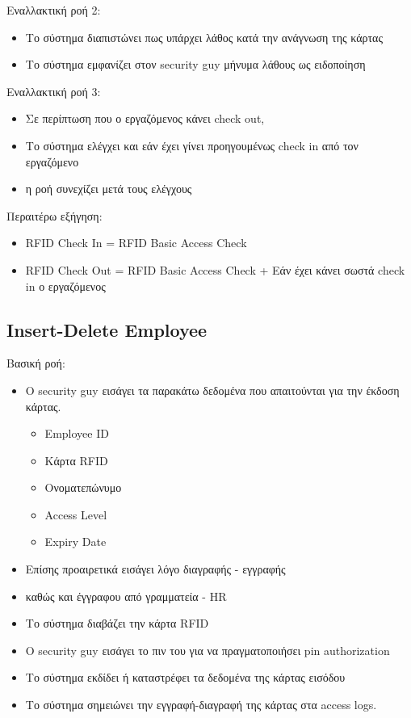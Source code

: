 \documentclass{article}
\begin{document}
\noindent Εναλλακτική ροή 2: 
\begin{itemize}
    \item Το σύστημα διαπιστώνει πως υπάρχει λάθος κατά την ανάγνωση της κάρτας
    \item Το σύστημα εμφανίζει στον security guy μήνυμα λάθους ως ειδοποίηση
\end{itemize}

\noindent Εναλλακτική ροή 3: 
\begin{itemize}
    \item Σε περίπτωση που ο εργαζόμενος κάνει check out,
    \item Το σύστημα ελέγχει και εάν έχει γίνει προηγουμένως check in από τον εργαζόμενο
    \item η ροή συνεχίζει μετά τους ελέγχους
\end{itemize}

\noindent Περαιτέρω εξήγηση:
\begin{itemize}
\item RFID Check In = RFID Basic Access Check
\item RFID Check Out = RFID Basic Access Check + Εάν έχει κάνει σωστά check in ο εργαζόμενος
\end{itemize}

\subsection{Insert-Delete Employee}

\noindent Βασική ροή:
\begin{itemize}
    \item Ο security guy εισάγει τα παρακάτω δεδομένα που απαιτούνται για την έκδοση κάρτας.
    \begin{itemize}
        \item Employee ID
        \item Κάρτα RFID
        \item Ονοματεπώνυμο
        \item Access Level
        \item Expiry Date
    \end{itemize}
    \item Επίσης προαιρετικά εισάγει λόγο διαγραφής - εγγραφής 
    \item καθώς και έγγραφου από γραμματεία - HR
    \item Το σύστημα διαβάζει την κάρτα RFID
    \item Ο security guy εισάγει το πιν του για να πραγματοποιήσει pin authorization
    \item Το σύστημα εκδίδει ή καταστρέφει τα δεδομένα της κάρτας εισόδου
    \item Το σύστημα σημειώνει την εγγραφή-διαγραφή της κάρτας στα access logs.
\end{itemize}
\end{document}
